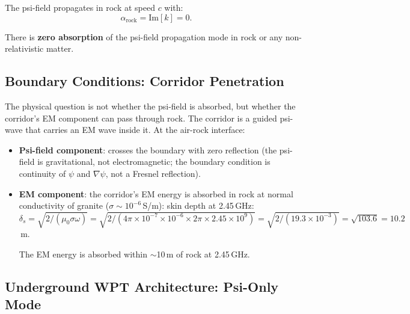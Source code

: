\documentclass[aps,prd,twocolumn,superscriptaddress]{revtex4-2}
\begin{document}
The psi-field propagates in rock at speed $c$ with:
\begin{equation}
\alpha_\mathrm{rock} = \mathrm{Im}[k] = 0.
\label{eq:zero_absorption}
\end{equation}

There is \textbf{zero absorption} of the psi-field propagation mode
in rock or any non-relativistic matter.

\subsection{Boundary Conditions: Corridor Penetration}

The physical question is not whether the psi-field is absorbed, but
whether the corridor's EM component can pass through rock.  The
corridor is a guided psi-wave that carries an EM wave inside it.
At the air-rock interface:

\begin{itemize}
\item \textbf{Psi-field component}: crosses the boundary with zero reflection
(the psi-field is gravitational, not electromagnetic; the boundary condition
is continuity of $\psi$ and $\nabla\psi$, not a Fresnel reflection).

\item \textbf{EM component}: the corridor's EM energy is absorbed in rock
at normal conductivity of granite ($\sigma \sim 10^{-6}$\,S/m):
skin depth at 2.45\,GHz:
$\delta_s = \sqrt{2/(\mu_0\sigma\omega)} = \sqrt{2/(4\pi\times10^{-7}\times10^{-6}
\times2\pi\times2.45\times10^9)} = \sqrt{2/(19.3\times10^{-3})} = \sqrt{103.6} = 10.2$\,m.

The EM energy is absorbed within $\sim$10\,m of rock at 2.45\,GHz.
\end{itemize}

\subsection{Underground WPT Architecture: Psi-Only Mode}
\end{document}
